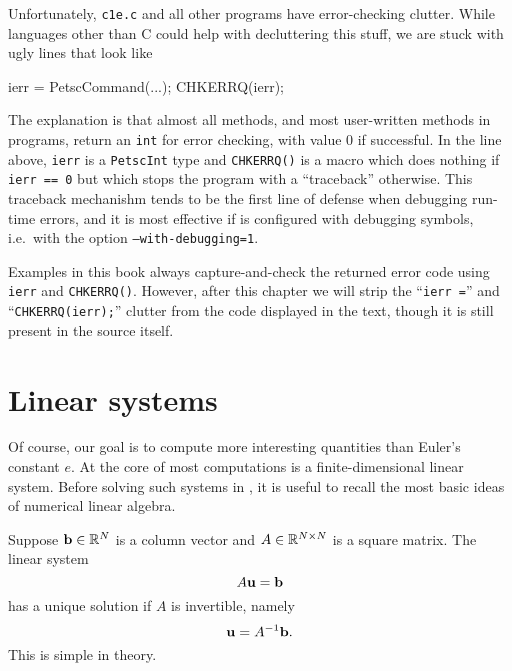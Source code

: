 Unfortunately, \texttt{c1e.c} and all other \PETSc programs have error-checking clutter.  While languages other than C could help with decluttering this stuff, we are stuck with ugly lines that look like
\begin{code}
ierr = PetscCommand(...); CHKERRQ(ierr);
\end{code}
The explanation is that almost all \PETSc methods, and most user-written methods in \PETSc programs, return an \texttt{int} for error checking, with value $0$ if successful.  In the line above, \texttt{ierr} is a \texttt{PetscInt} type and \texttt{CHKERRQ()} is a macro which does nothing if \texttt{ierr == 0} but which stops the program with a ``traceback'' otherwise.  This traceback mechanishm tends to be the first line of defense when debugging run-time errors, and it is most effective if \PETSc is configured with debugging symbols, i.e.~with the option \texttt{--with-debugging=1}.

Examples in this book always capture-and-check the returned error code using \texttt{ierr} and \texttt{CHKERRQ()}.  However, after this chapter we will strip the ``\texttt{ierr =}'' and ``\texttt{CHKERRQ(ierr);}'' clutter from the code displayed in the text, though it is still present in the source itself.


\section{Linear systems}

Of course, our goal is to compute more interesting quantities than Euler's constant $e$.  At the core of most \PETSc computations is a finite-dimensional linear system.  Before solving such systems in \PETSc, it is useful to recall the most basic ideas of numerical linear algebra.

Suppose $\mathbf{b}\in \mathbb{R}^{N}$ is a column vector and $A\in\mathbb{R}^{N\times N}$ is a square matrix.  The linear system
\begin{equation}
A \mathbf{u} = \mathbf{b} \label{introsystem}
\end{equation}
has a unique solution if $A$ is invertible, namely
\begin{equation}
\mathbf{u} = A^{-1} \mathbf{b}. \label{introsolution}
\end{equation}
This is simple in theory.

